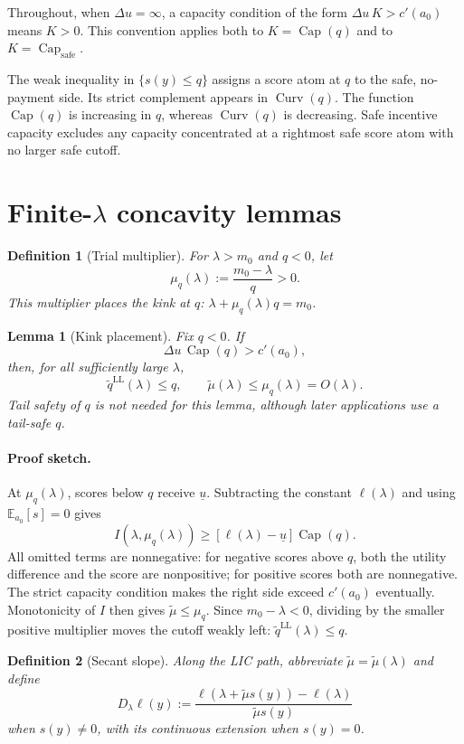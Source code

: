 \documentclass[11pt]{article}
\newtheorem{lemma}{Lemma}
\newtheorem{definition}{Definition}
\theoremstyle{remark}
\newcommand{\E}{\mathbb E}
\DeclareMathOperator{\Capacity}{Cap}
\DeclareMathOperator{\Curv}{Curv}
\newcommand{\proofsketch}{\paragraph{Proof sketch.}}
\begin{document}
Throughout, when $\Delta u=\infty$, a capacity condition of the form
$\Delta u\,K>c'(a_0)$ means $K>0$.  This convention applies both to
$K=\Capacity(q)$ and to $K=\Capacity_{\mathrm{safe}}$.

The weak inequality in $\{s(y)\le q\}$ assigns a score atom at $q$ to the safe,
no-payment side.  Its strict complement appears in $\Curv(q)$.  The function
$\Capacity(q)$ is increasing in $q$, whereas $\Curv(q)$ is decreasing.  Safe
incentive capacity excludes any capacity concentrated at a rightmost safe score
atom with no larger safe cutoff.

\section{Finite-\texorpdfstring{$\lambda$}{lambda} concavity lemmas}

\begin{definition}[Trial multiplier]
For $\lambda>m_0$ and $q<0$, let
\[
 \mu_q(\lambda):=\frac{m_0-\lambda}{q}>0.
\]
This multiplier places the kink at $q$:
$\lambda+\mu_q(\lambda)q=m_0$.
\end{definition}

\begin{lemma}[Kink placement]
\label{lem:kink-placement}
Fix $q<0$.  If
\[
 \Delta u\,\Capacity(q)>c'(a_0),
\]
then, for all sufficiently large $\lambda$,
\[
 \widetilde q^{\mathrm{LL}}(\lambda)\le q,
 \qquad
 \widetilde\mu(\lambda)\le\mu_q(\lambda)=O(\lambda).
\]
Tail safety of $q$ is not needed for this lemma, although later applications use
a tail-safe $q$.
\end{lemma}

\proofsketch
At $\mu_q(\lambda)$, scores below $q$ receive $\underline u$.  Subtracting the
constant $\ell(\lambda)$ and using $\E_{a_0}[s]=0$ gives
\[
 I(\lambda,\mu_q(\lambda))
 \ge [\ell(\lambda)-\underline u]\Capacity(q).
\]
All omitted terms are nonnegative: for negative scores above $q$, both the utility
difference and the score are nonpositive; for positive scores both are nonnegative.
The strict capacity condition makes the right side exceed $c'(a_0)$ eventually.
Monotonicity of $I$ then gives $\widetilde\mu\le\mu_q$.  Since $m_0-\lambda<0$,
dividing by the smaller positive multiplier moves the cutoff weakly left:
$\widetilde q^{\mathrm{LL}}(\lambda)\le q$.

\begin{definition}[Secant slope]
Along the LIC path, abbreviate $\widetilde\mu=\widetilde\mu(\lambda)$ and define
\[
 D_\lambda\ell(y):=
 \frac{\ell(\lambda+\widetilde\mu s(y))-\ell(\lambda)}{\widetilde\mu s(y)}
\]
when $s(y)\ne0$, with its continuous extension when $s(y)=0$.
\end{definition}
\end{document}
